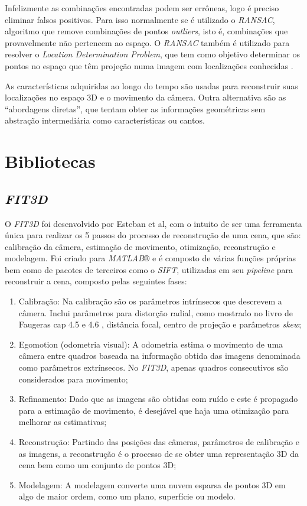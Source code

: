 Infelizmente as combinações encontradas podem ser errôneas, logo é preciso eliminar falsos positivos. Para isso normalmente se é utilizado o \textit{RANSAC}, algoritmo que remove combinações de pontos \textit{outliers}, isto é, combinações que provavelmente não pertencem ao espaço. O \textit{RANSAC} também é utilizado para resolver o \textit{Location Determination Problem}, que tem como objetivo determinar os pontos no espaço que têm projeção numa imagem com localizações conhecidas \cite{RANSAC}.

As características adquiridas ao longo do tempo são usadas para reconstruir suas localizações no espaço 3D e o movimento da câmera. Outra alternativa são as “abordagens diretas”, que tentam obter as informações geométricas sem abstração intermediária como características ou cantos.
  
\section{Bibliotecas}
  
\subsection{\textit{FIT3D}}
O \textit{FIT3D} foi desenvolvido por Esteban et al\cite{FIT3D}, com o intuito de ser uma ferramenta única para realizar os 5 passos do processo de reconstrução de uma cena, que são: calibração da câmera, estimação de movimento, otimização, reconstrução e modelagem. Foi criado para \textit{MATLAB}® e é composto de várias funções próprias bem como de pacotes de terceiros como o \textit{SIFT}, utilizadas em seu \textit{pipeline} para reconstruir a cena, composto pelas seguintes fases:
\begin{enumerate}
\item Calibração: Na calibração são os parâmetros intrínsecos que descrevem a câmera. Inclui parâmetros para distorção radial, como mostrado no livro de Faugeras cap 4.5 e 4.6 \cite{Faugeras-Geometry}, distância focal, centro de projeção e parâmetros \textit{skew};
 \item Egomotion (odometria visual): A odometria estima o movimento de uma câmera entre quadros baseada na informação obtida das imagens denominada como parâmetros extrínsecos. No \textit{FIT3D}, apenas quadros consecutivos são considerados para movimento;
 \item Refinamento: Dado que as imagens são obtidas com ruído e este é propagado para a estimação de movimento, é desejável que haja uma otimização para melhorar as estimativas;
 \item Reconstrução: Partindo das posições das câmeras, parâmetros de calibração e as imagens, a reconstrução é o processo de se obter uma representação 3D da cena bem como um conjunto de pontos 3D;
 \item Modelagem: A modelagem converte uma nuvem esparsa de pontos 3D em algo de maior ordem, como um plano, superfície ou modelo.
\end{enumerate}
  

